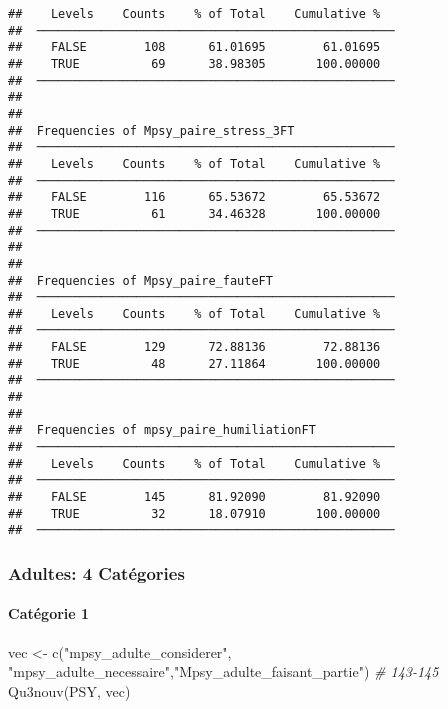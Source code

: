 \documentclass[
]{article}
\newenvironment{Shaded}{\begin{snugshade}}{\end{snugshade}}
\newcommand{\CommentTok}[1]{\textcolor[rgb]{0.56,0.35,0.01}{\textit{#1}}}
\newcommand{\FunctionTok}[1]{\textcolor[rgb]{0.00,0.00,0.00}{#1}}
\newcommand{\NormalTok}[1]{#1}
\newcommand{\OtherTok}[1]{\textcolor[rgb]{0.56,0.35,0.01}{#1}}
\newcommand{\StringTok}[1]{\textcolor[rgb]{0.31,0.60,0.02}{#1}}
\begin{document}
\begin{verbatim}
##    Levels    Counts    % of Total    Cumulative %   
##  ────────────────────────────────────────────────── 
##    FALSE        108      61.01695        61.01695   
##    TRUE          69      38.98305       100.00000   
##  ────────────────────────────────────────────────── 
## 
## 
##  Frequencies of Mpsy_paire_stress_3FT               
##  ────────────────────────────────────────────────── 
##    Levels    Counts    % of Total    Cumulative %   
##  ────────────────────────────────────────────────── 
##    FALSE        116      65.53672        65.53672   
##    TRUE          61      34.46328       100.00000   
##  ────────────────────────────────────────────────── 
## 
## 
##  Frequencies of Mpsy_paire_fauteFT                  
##  ────────────────────────────────────────────────── 
##    Levels    Counts    % of Total    Cumulative %   
##  ────────────────────────────────────────────────── 
##    FALSE        129      72.88136        72.88136   
##    TRUE          48      27.11864       100.00000   
##  ────────────────────────────────────────────────── 
## 
## 
##  Frequencies of mpsy_paire_humiliationFT            
##  ────────────────────────────────────────────────── 
##    Levels    Counts    % of Total    Cumulative %   
##  ────────────────────────────────────────────────── 
##    FALSE        145      81.92090        81.92090   
##    TRUE          32      18.07910       100.00000   
##  ──────────────────────────────────────────────────
\end{verbatim}

\hypertarget{adultes-4-catuxe9gories}{%
\subsubsection{Adultes: 4 Catégories}\label{adultes-4-catuxe9gories}}

\hypertarget{catuxe9gorie-1-1}{%
\paragraph{Catégorie 1}\label{catuxe9gorie-1-1}}

\begin{Shaded}
\begin{Highlighting}[]
\NormalTok{vec }\OtherTok{\textless{}{-}} \FunctionTok{c}\NormalTok{(}\StringTok{"mpsy\_adulte\_considerer"}\NormalTok{,}
         \StringTok{"mpsy\_adulte\_necessaire"}\NormalTok{,}\StringTok{"Mpsy\_adulte\_faisant\_partie"}\NormalTok{)  }\CommentTok{\# 143{-}145}
\FunctionTok{Qu3nouv}\NormalTok{(PSY, vec)}
\end{Highlighting}
\end{Shaded}
\end{document}
